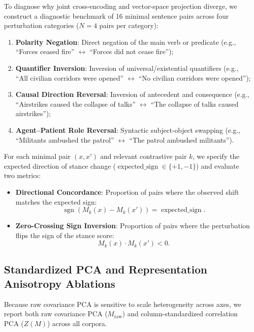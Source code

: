 To diagnose why joint cross-encoding and vector-space projection diverge, we construct a diagnostic benchmark of 16 minimal sentence pairs across four perturbation categories ($N=4$ pairs per category):
\begin{enumerate}
    \item \textbf{Polarity Negation}: Direct negation of the main verb or predicate (e.g., ``Forces ceased fire'' $\leftrightarrow$ ``Forces did not cease fire'');
    \item \textbf{Quantifier Inversion}: Inversion of universal/existential quantifiers (e.g., ``All civilian corridors were opened'' $\leftrightarrow$ ``No civilian corridors were opened'');
    \item \textbf{Causal Direction Reversal}: Inversion of antecedent and consequence (e.g., ``Airstrikes caused the collapse of talks'' $\leftrightarrow$ ``The collapse of talks caused airstrikes'');
    \item \textbf{Agent--Patient Role Reversal}: Syntactic subject-object swapping (e.g., ``Militants ambushed the patrol'' $\leftrightarrow$ ``The patrol ambushed militants'').
\end{enumerate}
For each minimal pair $(x, x')$ and relevant contrastive pair $k$, we specify the expected direction of stance change ($\operatorname{expected\_sign} \in \{+1, -1\}$) and evaluate two metrics:
\begin{itemize}
    \item \textbf{Directional Concordance}: Proportion of pairs where the observed shift matches the expected sign:
    \begin{equation}
        \operatorname{sgn}(M_k(x) - M_k(x')) = \operatorname{expected\_sign}.
    \end{equation}
    \item \textbf{Zero-Crossing Sign Inversion}: Proportion of pairs where the perturbation flips the sign of the stance score:
    \begin{equation}
        M_k(x) \cdot M_k(x') < 0.
    \end{equation}
\end{itemize}

\subsection{Standardized PCA and Representation Anisotropy Ablations}
\label{sec:meth_anisotropy}

Because raw covariance PCA is sensitive to scale heterogeneity across axes, we report both raw covariance PCA ($M_{\text{raw}}$) and column-standardized correlation PCA ($Z(M)$) across all corpora.

